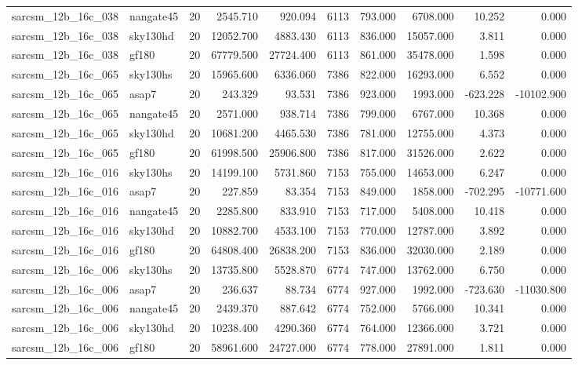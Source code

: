\begin{tabular}{llrrrrrrrr}
sarcsm\_12b\_16c\_038 & nangate45 & 20 & 2545.710 & 920.094 & 6113 & 793.000 & 6708.000 & 10.252 & 0.000 \\
sarcsm\_12b\_16c\_038 & sky130hd & 20 & 12052.700 & 4883.430 & 6113 & 836.000 & 15057.000 & 3.811 & 0.000 \\
sarcsm\_12b\_16c\_038 & gf180 & 20 & 67779.500 & 27724.400 & 6113 & 861.000 & 35478.000 & 1.598 & 0.000 \\
sarcsm\_12b\_16c\_065 & sky130hs & 20 & 15965.600 & 6336.060 & 7386 & 822.000 & 16293.000 & 6.552 & 0.000 \\
sarcsm\_12b\_16c\_065 & asap7 & 20 & 243.329 & 93.531 & 7386 & 923.000 & 1993.000 & -623.228 & -10102.900 \\
sarcsm\_12b\_16c\_065 & nangate45 & 20 & 2571.000 & 938.714 & 7386 & 799.000 & 6767.000 & 10.368 & 0.000 \\
sarcsm\_12b\_16c\_065 & sky130hd & 20 & 10681.200 & 4465.530 & 7386 & 781.000 & 12755.000 & 4.373 & 0.000 \\
sarcsm\_12b\_16c\_065 & gf180 & 20 & 61998.500 & 25906.800 & 7386 & 817.000 & 31526.000 & 2.622 & 0.000 \\
sarcsm\_12b\_16c\_016 & sky130hs & 20 & 14199.100 & 5731.860 & 7153 & 755.000 & 14653.000 & 6.247 & 0.000 \\
sarcsm\_12b\_16c\_016 & asap7 & 20 & 227.859 & 83.354 & 7153 & 849.000 & 1858.000 & -702.295 & -10771.600 \\
sarcsm\_12b\_16c\_016 & nangate45 & 20 & 2285.800 & 833.910 & 7153 & 717.000 & 5408.000 & 10.418 & 0.000 \\
sarcsm\_12b\_16c\_016 & sky130hd & 20 & 10882.700 & 4533.100 & 7153 & 770.000 & 12787.000 & 3.892 & 0.000 \\
sarcsm\_12b\_16c\_016 & gf180 & 20 & 64808.400 & 26838.200 & 7153 & 836.000 & 32030.000 & 2.189 & 0.000 \\
sarcsm\_12b\_16c\_006 & sky130hs & 20 & 13735.800 & 5528.870 & 6774 & 747.000 & 13762.000 & 6.750 & 0.000 \\
sarcsm\_12b\_16c\_006 & asap7 & 20 & 236.637 & 88.734 & 6774 & 927.000 & 1992.000 & -723.630 & -11030.800 \\
sarcsm\_12b\_16c\_006 & nangate45 & 20 & 2439.370 & 887.642 & 6774 & 752.000 & 5766.000 & 10.341 & 0.000 \\
sarcsm\_12b\_16c\_006 & sky130hd & 20 & 10238.400 & 4290.360 & 6774 & 764.000 & 12366.000 & 3.721 & 0.000 \\
sarcsm\_12b\_16c\_006 & gf180 & 20 & 58961.600 & 24727.000 & 6774 & 778.000 & 27891.000 & 1.811 & 0.000 \\

\end{tabular}
